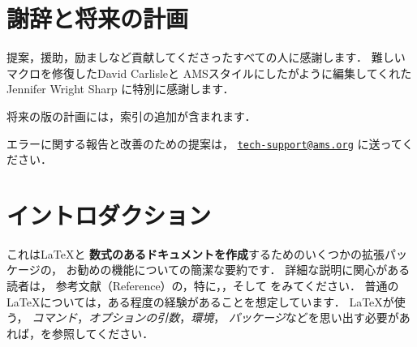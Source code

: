 \setcounter{tocdepth}{3}
\tableofcontents

\vspace{\fill}
\section*{謝辞と将来の計画}
提案，援助，励ましなど貢献してくださったすべての人に感謝します．
難しいマクロを修復したDavid Carlisleと
AMSスタイルにしたがように編集してくれたJennifer Wright Sharp
に特別に感謝します．

\smallskip\noindent
将来の版の計画には，索引の追加が含まれます．

\smallskip\noindent
エラーに関する報告と改善のための提案は，
\hspace*{\fill}
\href{mailto:tech-support@ams.org}{\texttt{tech-support@ams.org}}
に送ってください．
\hspace{\fill}\null

\newpage


\section{イントロダクション}


これは\LaTeX{}と
\textbf{数式のあるドキュメントを作成}するためのいくつかの拡張パッケージの，
お勧めの機能についての簡潔な要約です．
詳細な説明に関心がある読者は，
参考文献（Reference）の，特に\cite{lamport}，\cite{amsldoc}，そして
\cite{fntguide}をみてください．
普通の\LaTeX{}については，ある程度の経験があることを想定しています．
\LaTeX{}が使う，
\emph{コマンド}，\emph{オプションの引数}，\emph{環境}，
\emph{パッケージ}などを思い出す必要があれば，\cite{lamport}を参照してください．


